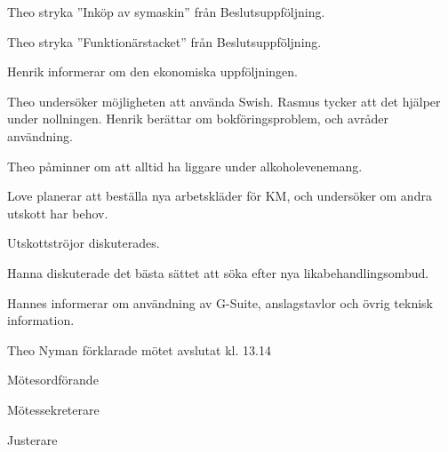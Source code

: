 \documentclass[10pt]{article}
\def\mo{Theo Nyman}
\def\ms{Hannes Björk}
\def\ji{Rasmus Sobel}
\begin{document}
\begin{paragrafer}

Theo \ypa stryka ''Inköp av symaskin'' från Beslutsuppföljning.

\Mbaby 

Theo \ypa stryka ''Funktionärstacket'' från Beslutsuppföljning.

\Mbaby 


Henrik informerar om den ekonomiska uppföljningen.

Theo undersöker möjligheten att använda Swish. Rasmus tycker att det hjälper under nollningen. Henrik berättar om bokföringsproblem, och avråder användning.

Theo påminner om att alltid ha liggare under alkoholevenemang.

Love planerar att beställa nya arbetskläder för KM, och undersöker om andra utskott har behov.

Utskottströjor diskuterades.

Hanna diskuterade det bästa sättet att söka efter nya likabehandlingsombud.

Hannes informerar om användning av G-Suite, anslagstavlor och övrig teknisk information.

{\mo} förklarade mötet avslutat kl. 13.14
\end{paragrafer}

\hidesignfoot
\begin{signatures}{3}
\signature{\mo}{Mötesordförande}
\signature{\ms}{Mötessekreterare}
\signature{\ji}{Justerare}
\end{signatures}
\end{document}
